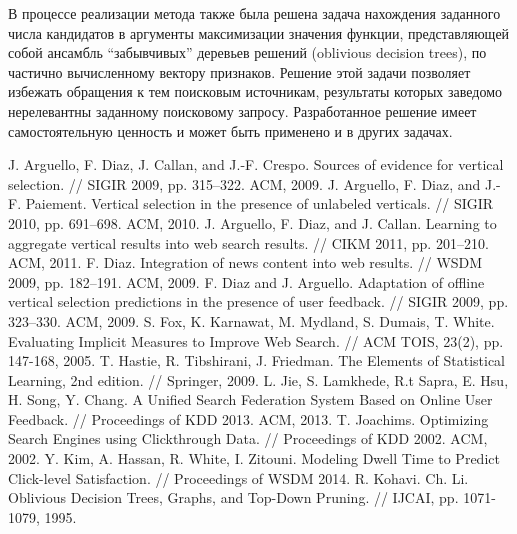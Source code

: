 \documentclass[12pt,a4paper]{report}
\renewcommand{\bibname}{Список литературы}
\begin{document}
В процессе реализации метода также была решена задача нахождения заданного числа кандидатов в аргументы максимизации значения функции, представляющей собой ансамбль ``забывчивых'' деревьев решений (oblivious decision trees), по частично вычисленному вектору признаков. Решение этой задачи позволяет избежать обращения к тем поисковым источникам, результаты которых заведомо нерелевантны заданному поисковому запросу. Разработанное решение имеет самостоятельную ценность и может быть применено и в других задачах.

\renewcommand{\bibname}{Список литературы}
\begin{thebibliography}{@}
   J. Arguello, F. Diaz, J. Callan, and J.-F. Crespo. Sources of evidence for vertical selection. // SIGIR 2009, pp. 315–322. ACM, 2009.
   J. Arguello, F. Diaz, and J.-F. Paiement. Vertical selection in the presence of unlabeled verticals. // SIGIR 2010, pp. 691–698. ACM, 2010.
   J. Arguello, F. Diaz, and J. Callan. Learning to aggregate vertical results into web search results. // CIKM 2011, pp. 201–210. ACM, 2011.
    F. Diaz. Integration of news content into web results. // WSDM 2009, pp. 182–191. ACM, 2009.
   F. Diaz and J. Arguello. Adaptation of offline vertical selection predictions in the presence of user feedback. // SIGIR 2009, pp. 323–330. ACM, 2009.
   S. Fox, K. Karnawat, M. Mydland, S. Dumais, T. White. Evaluating Implicit Measures to Improve Web Search. // ACM TOIS, 23(2), pp. 147-168, 2005.    
   T. Hastie, R. Tibshirani, J. Friedman. The Elements of Statistical Learning, 2nd edition. // Springer, 2009.  
   L. Jie, S. Lamkhede, R.t Sapra, E. Hsu, H. Song, Y. Chang. A Unified Search Federation System Based on Online User Feedback. // Proceedings of KDD 2013. ACM, 2013.    
   T. Joachims. Optimizing Search Engines using Clickthrough Data. // Proceedings of KDD 2002. ACM, 2002.
   Y. Kim, A. Hassan, R. White, I. Zitouni. Modeling Dwell Time to Predict Click-level Satisfaction. // Proceedings of WSDM 2014.
   R. Kohavi. Ch. Li. Oblivious Decision Trees, Graphs, and Top-Down Pruning. // IJCAI, pp. 1071-1079, 1995.

\end{thebibliography}
\end{document}
